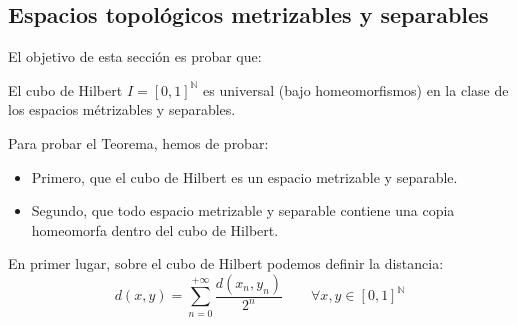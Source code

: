 \subsection{Espacios topológicos metrizables y separables}
El objetivo de esta sección es probar que:
\begin{teo}
    El cubo de Hilbert $I = {[0,1]}^{\mathbb{N}}$ es universal (bajo homeomorfismos) en la clase de los espacios métrizables y separables.
\end{teo}
Para probar el Teorema, hemos de probar:
\begin{itemize}
    \item Primero, que el cubo de Hilbert es un espacio metrizable y separable.
    \item Segundo, que todo espacio metrizable y separable contiene una copia homeomorfa dentro del cubo de Hilbert.
\end{itemize}
En primer lugar, sobre el cubo de Hilbert podemos definir la distancia:
\begin{equation*}
    d(x,y) = \sum_{n=0}^{+\infty} \dfrac{d(x_n,y_n)}{2^n} \qquad \forall x,y\in {[0,1]}^{\mathbb{N}}
\end{equation*}
